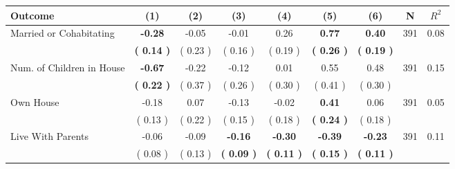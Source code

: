 \begin{tabular}{lcccccccc}
\toprule
 \textbf{Outcome} & \textbf{(1)} & \textbf{(2)} & \textbf{(3)} & \textbf{(4)} & \textbf{(5)} & \textbf{(6)} & \textbf{N} & \textbf{$ R^2$} \\
\midrule
Married or Cohabitating & \textbf{    -0.28} &     -0.05 &     -0.01 &      0.26 & \textbf{     0.77} & \textbf{     0.40} & 391 &       0.08 \\ 
 & \textbf{(     0.14 )} & (     0.23 ) & (     0.16 ) & (     0.19 ) & \textbf{(     0.26 )} & \textbf{(     0.19 )} & \\
Num. of Children in House & \textbf{    -0.67} &     -0.22 &     -0.12 &      0.01 &      0.55 &      0.48 & 391 &       0.15 \\ 
 & \textbf{(     0.22 )} & (     0.37 ) & (     0.26 ) & (     0.30 ) & (     0.41 ) & (     0.30 ) & \\
Own House &     -0.18 &      0.07 &     -0.13 &     -0.02 & \textbf{     0.41} &      0.06 & 391 &       0.05 \\ 
 & (     0.13 ) & (     0.22 ) & (     0.15 ) & (     0.18 ) & \textbf{(     0.24 )} & (     0.18 ) & \\
Live With Parents &     -0.06 &     -0.09 & \textbf{    -0.16} & \textbf{    -0.30} & \textbf{    -0.39} & \textbf{    -0.23} & 391 &       0.11 \\ 
 & (     0.08 ) & (     0.13 ) & \textbf{(     0.09 )} & \textbf{(     0.11 )} & \textbf{(     0.15 )} & \textbf{(     0.11 )} & \\
\bottomrule
\end{tabular}
